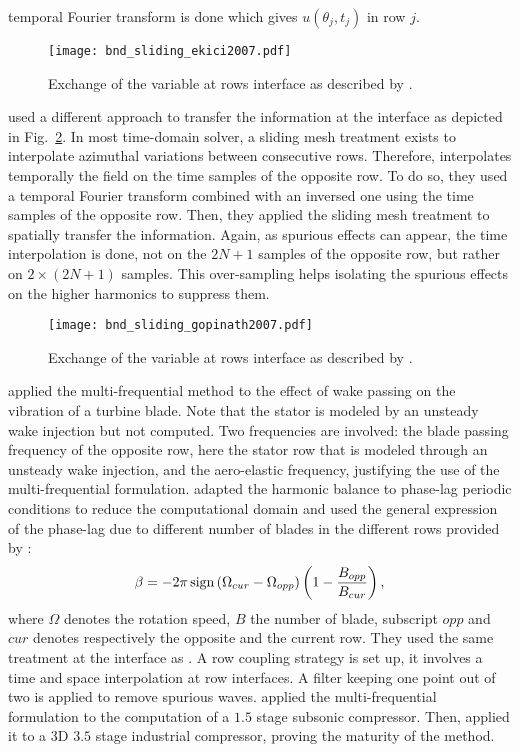 temporal Fourier transform is done which gives $u (\theta_j, t_j)$
in row $j$.
\begin{figure}[htbp]
  \centering
  \texttt{[image: bnd\_sliding\_ekici2007.pdf]}
  \caption{Exchange of the variable at rows interface as described by \citet{Ekici2007}.}
  \label{fig:bnd_sliding_ekici2007}
\end{figure}
\citet{Gopinath2007} used a different approach to transfer
the information at the interface as depicted
in Fig.~\ref{fig:bnd_sliding_gopinath2007}. In most time-domain solver,
a sliding mesh treatment exists to interpolate azimuthal variations
between consecutive rows. Therefore, \citet{Gopinath2007}
interpolates temporally the field on the time samples
of the opposite row. To do so, they used a temporal Fourier
transform combined with an inversed one using the time samples
of the opposite row.
Then, they applied the sliding mesh treatment
to spatially transfer the information. Again, as spurious effects
can appear, the time interpolation is done, not on the $2N+1$ samples
of the opposite row, but rather on $2 \times (2N+1)$ samples. This over-sampling
helps isolating the spurious effects on the higher harmonics to suppress them.
\begin{figure}[htbp]
  \centering
  \texttt{[image: bnd\_sliding\_gopinath2007.pdf]}
  \caption{Exchange of the variable at rows interface as described by \citet{Gopinath2007}.}
  \label{fig:bnd_sliding_gopinath2007}
\end{figure}
\citet{Ekici2008a} applied the multi-frequential method
to the effect of wake passing on the vibration of
a turbine blade. Note that the stator is modeled
by an unsteady wake injection but not computed.
Two frequencies are involved: the blade passing
frequency of the opposite row, here the
stator row that is modeled through an unsteady wake injection,
and the aero-elastic frequency, justifying the use
of the multi-frequential formulation.
\citet{JSicot2012} adapted the harmonic balance 
to phase-lag periodic 
conditions to reduce the computational domain
and used the general expression of the phase-lag due to
different number of blades in the different rows 
provided by \citet{Gerolymos1991}:
\begin{equation}
 	\beta = - 2 \pi \operatorname{sign} \left(\Omega_{cur} - \Omega_{opp} \right) 
 	\left(1 - \frac{B_{opp}}{B_{cur}}\right),
\end{equation} 
where $\Omega$ denotes the rotation speed, $B$ the number
of blade, subscript $opp$ and $cur$ denotes respectively the
opposite and the current row. They used the same treatment
at the interface as \citet{Gopinath2007}.
A row coupling strategy is set up, it involves 
a time and space interpolation at row interfaces.
A filter keeping one point out of two 
is applied to remove spurious waves.
\citet{JGuedeney2013} applied the multi-frequential
formulation to the computation of a $1.5$ stage subsonic
compressor.
Then, \citet{JSicot2013} applied it to a $3$D
$3.5$ stage industrial compressor, proving the maturity of
the method.

